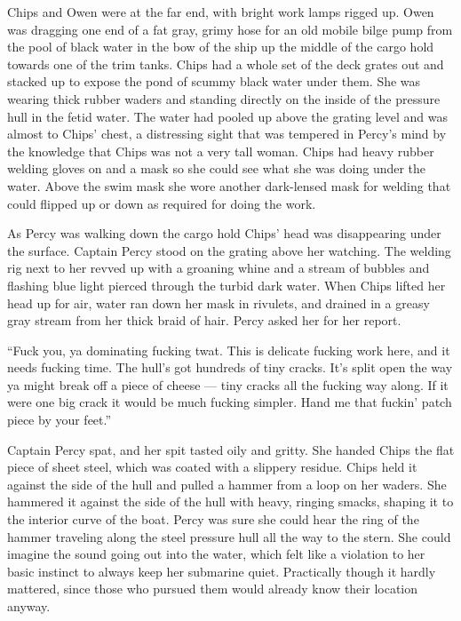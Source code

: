 \documentclass[]{scrbook}
\begin{document}
Chips and Owen were at the far end, with bright work lamps rigged up.
Owen was dragging one end of a fat gray, grimy hose for an old mobile
bilge pump from the pool of black water in the bow of the ship up the
middle of the cargo hold towards one of the trim tanks. Chips had a
whole set of the deck grates out and stacked up to expose the pond of
scummy black water under them. She was wearing thick rubber waders and
standing directly on the inside of the pressure hull in the fetid water.
The water had pooled up above the grating level and was almost to Chips'
chest, a distressing sight that was tempered in Percy's mind by the
knowledge that Chips was not a very tall woman. Chips had heavy rubber
welding gloves on and a mask so she could see what she was doing under
the water. Above the swim mask she wore another dark-lensed mask for
welding that could flipped up or down as required for doing the work.

As Percy was walking down the cargo hold Chips' head was disappearing
under the surface. Captain Percy stood on the grating above her
watching. The welding rig next to her revved up with a groaning whine
and a stream of bubbles and flashing blue light pierced through the
turbid dark water. When Chips lifted her head up for air, water ran down
her mask in rivulets, and drained in a greasy gray stream from her thick
braid of hair. Percy asked her for her report.

``Fuck you, ya dominating fucking twat. This is delicate fucking work
here, and it needs fucking time. The hull's got hundreds of tiny cracks.
It's split open the way ya might break off a piece of cheese --- tiny
cracks all the fucking way along. If it were one big crack it would be
much fucking simpler. Hand me that fuckin' patch piece by your feet.''

Captain Percy spat, and her spit tasted oily and gritty. She handed
Chips the flat piece of sheet steel, which was coated with a slippery
residue. Chips held it against the side of the hull and pulled a hammer
from a loop on her waders. She hammered it against the side of the hull
with heavy, ringing smacks, shaping it to the interior curve of the
boat. Percy was sure she could hear the ring of the hammer traveling
along the steel pressure hull all the way to the stern. She could
imagine the sound going out into the water, which felt like a violation
to her basic instinct to always keep her submarine quiet. Practically
though it hardly mattered, since those who pursued them would already
know their location anyway.
\end{document}
